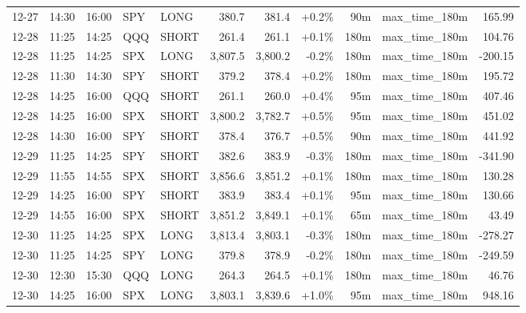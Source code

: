 \documentclass[11pt,a4paper,twoside]{article}
\begin{document}
\begin{center}
\begin{longtable}{>{\color{txtmain}}l l l l l r r r r >{\color{txtmain}}l r}
12-27 & 14:30 & 16:00 & SPY & LONG & 380.7 & 381.4 & \textcolor{wingreen}{+0.2\%} & 90m & max\_time\_180m & \textcolor{wingreen}{165.99} \\
12-28 & 11:25 & 14:25 & QQQ & SHORT & 261.4 & 261.1 & \textcolor{wingreen}{+0.1\%} & 180m & max\_time\_180m & \textcolor{wingreen}{104.76} \\
12-28 & 11:25 & 14:25 & SPX & LONG & 3,807.5 & 3,800.2 & \textcolor{lossred}{-0.2\%} & 180m & max\_time\_180m & \textcolor{lossred}{-200.15} \\
12-28 & 11:30 & 14:30 & SPY & SHORT & 379.2 & 378.4 & \textcolor{wingreen}{+0.2\%} & 180m & max\_time\_180m & \textcolor{wingreen}{195.72} \\
12-28 & 14:25 & 16:00 & QQQ & SHORT & 261.1 & 260.0 & \textcolor{wingreen}{+0.4\%} & 95m & max\_time\_180m & \textcolor{wingreen}{407.46} \\
12-28 & 14:25 & 16:00 & SPX & SHORT & 3,800.2 & 3,782.7 & \textcolor{wingreen}{+0.5\%} & 95m & max\_time\_180m & \textcolor{wingreen}{451.02} \\
12-28 & 14:30 & 16:00 & SPY & SHORT & 378.4 & 376.7 & \textcolor{wingreen}{+0.5\%} & 90m & max\_time\_180m & \textcolor{wingreen}{441.92} \\
12-29 & 11:25 & 14:25 & SPY & SHORT & 382.6 & 383.9 & \textcolor{lossred}{-0.3\%} & 180m & max\_time\_180m & \textcolor{lossred}{-341.90} \\
12-29 & 11:55 & 14:55 & SPX & SHORT & 3,856.6 & 3,851.2 & \textcolor{wingreen}{+0.1\%} & 180m & max\_time\_180m & \textcolor{wingreen}{130.28} \\
12-29 & 14:25 & 16:00 & SPY & SHORT & 383.9 & 383.4 & \textcolor{wingreen}{+0.1\%} & 95m & max\_time\_180m & \textcolor{wingreen}{130.66} \\
12-29 & 14:55 & 16:00 & SPX & SHORT & 3,851.2 & 3,849.1 & \textcolor{wingreen}{+0.1\%} & 65m & max\_time\_180m & \textcolor{wingreen}{43.49} \\
12-30 & 11:25 & 14:25 & SPX & LONG & 3,813.4 & 3,803.1 & \textcolor{lossred}{-0.3\%} & 180m & max\_time\_180m & \textcolor{lossred}{-278.27} \\
12-30 & 11:25 & 14:25 & SPY & LONG & 379.8 & 378.9 & \textcolor{lossred}{-0.2\%} & 180m & max\_time\_180m & \textcolor{lossred}{-249.59} \\
12-30 & 12:30 & 15:30 & QQQ & LONG & 264.3 & 264.5 & \textcolor{wingreen}{+0.1\%} & 180m & max\_time\_180m & \textcolor{wingreen}{46.76} \\
12-30 & 14:25 & 16:00 & SPX & LONG & 3,803.1 & 3,839.6 & \textcolor{wingreen}{+1.0\%} & 95m & max\_time\_180m & \textcolor{wingreen}{948.16} \\

\end{longtable}
\end{center}
\end{document}
